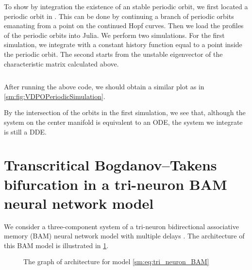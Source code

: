 To show by integration the existence of an stable periodic orbit, we first
located a periodic orbit in \DDEBIFTOOL. This can be done by continuing a
branch of periodic orbits emanating from a point on the continued Hopf curves.
Then we load the profiles of the periodic orbits into Julia. We perform two
simulations. For the first simulation, we integrate with a constant history
function equal to a point inside the periodic orbit. The second starts from the
unstable eigenvector of the characteristic matrix calculated above.
\inputminted[firstline=230, lastline=279]{julia}{\pathToJuliaFiles/vdpo_simulation_article.jl}
After running the above code, we should obtain a similar plot as in \cref{sm:fig:VDPOPeriodicSimulation}.
\begin{remark}
By the intersection of the orbits in the first simulation, we see that, although
the system on the center manifold is equivalent to an ODE, the system we
integrate is still a DDE.
\end{remark}


\section[Tri-neuron BAM neural network model]
        {Transcritical Bogdanov--Takens bifurcation in a tri-neuron BAM neural network model}
We consider a three-component system of a tri-neuron bidirectional
associative memory (BAM) neural network model with multiple delays
\cite{dong2013bogdanov}. The architecture of this BAM model is illustrated in
\cref{sm:fig:BAM_architecture_graph}. 

\begin{figure}
\centering
{}
\caption{The graph of architecture for model \cref{sm:eq:tri_neuron_BAM}}
\label{sm:fig:BAM_architecture_graph}
\end{figure}

